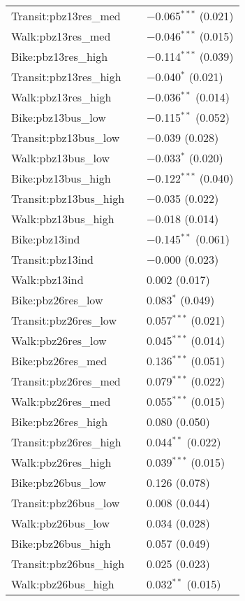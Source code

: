 \begin{longtabu}{lll}
	Transit:pbz13res\_med &  & $-$0.065$^{***}$ (0.021) \\ 
	Walk:pbz13res\_med &  & $-$0.046$^{***}$ (0.015) \\ 
	Bike:pbz13res\_high &  & $-$0.114$^{***}$ (0.039) \\ 
	Transit:pbz13res\_high &  & $-$0.040$^{*}$ (0.021) \\ 
	Walk:pbz13res\_high &  & $-$0.036$^{**}$ (0.014) \\ 
	Bike:pbz13bus\_low &  & $-$0.115$^{**}$ (0.052) \\ 
	Transit:pbz13bus\_low &  & $-$0.039 (0.028) \\ 
	Walk:pbz13bus\_low &  & $-$0.033$^{*}$ (0.020) \\ 
	Bike:pbz13bus\_high &  & $-$0.122$^{***}$ (0.040) \\ 
	Transit:pbz13bus\_high &  & $-$0.035 (0.022) \\ 
	Walk:pbz13bus\_high &  & $-$0.018 (0.014) \\ 
	Bike:pbz13ind &  & $-$0.145$^{**}$ (0.061) \\ 
	Transit:pbz13ind &  & $-$0.000 (0.023) \\ 
	Walk:pbz13ind &  & 0.002 (0.017) \\ 
	Bike:pbz26res\_low &  & 0.083$^{*}$ (0.049) \\ 
	Transit:pbz26res\_low &  & 0.057$^{***}$ (0.021) \\ 
	Walk:pbz26res\_low &  & 0.045$^{***}$ (0.014) \\ 
	Bike:pbz26res\_med &  & 0.136$^{***}$ (0.051) \\ 
	Transit:pbz26res\_med &  & 0.079$^{***}$ (0.022) \\ 
	Walk:pbz26res\_med &  & 0.055$^{***}$ (0.015) \\ 
	Bike:pbz26res\_high &  & 0.080 (0.050) \\ 
	Transit:pbz26res\_high &  & 0.044$^{**}$ (0.022) \\ 
	Walk:pbz26res\_high &  & 0.039$^{***}$ (0.015) \\ 
	Bike:pbz26bus\_low &  & 0.126 (0.078) \\ 
	Transit:pbz26bus\_low &  & 0.008 (0.044) \\ 
	Walk:pbz26bus\_low &  & 0.034 (0.028) \\ 
	Bike:pbz26bus\_high &  & 0.057 (0.049) \\ 
	Transit:pbz26bus\_high &  & 0.025 (0.023) \\ 
	Walk:pbz26bus\_high &  & 0.032$^{**}$ (0.015) \\ 

\end{longtabu}

